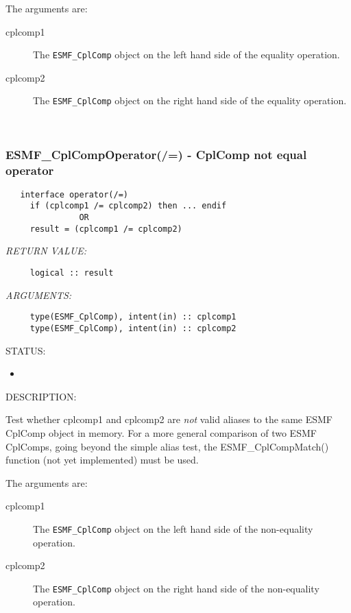      The arguments are:
     \begin{description}
     \item[cplcomp1]
       The {\tt ESMF\_CplComp} object on the left hand side of the equality
       operation.
     \item[cplcomp2]
       The {\tt ESMF\_CplComp} object on the right hand side of the equality
       operation.
     \end{description}
   
 
\mbox{}\hrulefill\ 
 
\subsubsection [ESMF\_CplCompOperator(/=)] {ESMF\_CplCompOperator(/=) - CplComp not equal operator}


  
\begin{verbatim}   interface operator(/=)
     if (cplcomp1 /= cplcomp2) then ... endif
               OR
     result = (cplcomp1 /= cplcomp2)\end{verbatim}{\em RETURN VALUE:}
\begin{verbatim}     logical :: result\end{verbatim}{\em ARGUMENTS:}
\begin{verbatim}     type(ESMF_CplComp), intent(in) :: cplcomp1
     type(ESMF_CplComp), intent(in) :: cplcomp2\end{verbatim}
{\sf STATUS:}
   \begin{itemize}
   \item{}
   \end{itemize}
  
{\sf DESCRIPTION:\\ }


     Test whether cplcomp1 and cplcomp2 are {\it not} valid aliases to the
     same ESMF CplComp object in memory. For a more general comparison of two ESMF
     CplComps, going beyond the simple alias test, the ESMF\_CplCompMatch() function
     (not yet implemented) must be used.
  
     The arguments are:
     \begin{description}
     \item[cplcomp1]
       The {\tt ESMF\_CplComp} object on the left hand side of the non-equality
       operation.
     \item[cplcomp2]
       The {\tt ESMF\_CplComp} object on the right hand side of the non-equality
       operation.
     \end{description}
   

